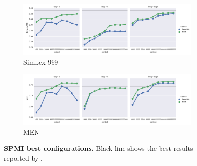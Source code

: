 \begin{figure}
  \centering
  \begin{subfigure}[b]{\textwidth}
    \includegraphics[width=\textwidth]{supplement/figures/SimLex999-ppmi-best.pdf}
    \caption{SimLex-999}
    \label{fig:simlex-ppmi-best-simlex}
  \end{subfigure}


  \begin{subfigure}[b]{\textwidth}
    \includegraphics[width=\textwidth]{supplement/figures/men-ppmi-best.pdf}
    \caption{MEN}
    \label{fig:simlex-ppmi-best-men}
  \end{subfigure}

  \caption{\textbf{SPMI best configurations.} Black line shows the best results reported by \protect{}.}
  \label{fig:simlex-ppmi-best}
\end{figure}

